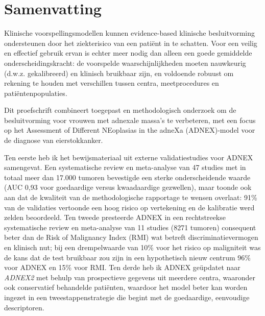 \chapter*{Samenvatting}
Klinische voorspellingsmodellen kunnen evidence-based klinische besluitvorming ondersteunen door het ziekterisico van een patiënt in te schatten. Voor een veilig en effectief gebruik ervan is echter meer nodig dan alleen een goede gemiddelde onderscheidingskracht: de voorspelde waarschijnlijkheden moeten nauwkeurig (d.w.z. gekalibreerd) en klinisch bruikbaar zijn, en voldoende robuust om rekening te houden met verschillen tussen centra, meetprocedures en patiëntenpopulaties.

Dit proefschrift combineert toegepast en methodologisch onderzoek om de besluitvorming voor vrouwen met adnexale massa's te verbeteren, met een focus op het Assessment of Different NEoplasias in the adneXa (\gls{ADNEX})-model voor de diagnose van eierstokkanker.

Ten eerste heb ik het bewijsmateriaal uit externe validatiestudies voor \gls{ADNEX} samengevat. Een systematische review en meta-analyse van 47 studies met in totaal meer dan 17.000 tumoren bevestigde een sterke onderscheidende waarde (AUC 0,93 voor goedaardige versus kwaadaardige gezwellen), maar toonde ook aan dat de kwaliteit van de methodologische rapportage te wensen overlaat: 91\% van de validaties vertoonde een hoog risico op vertekening en de kalibratie werd zelden beoordeeld. Ten tweede presteerde \gls{ADNEX} in een rechtstreekse systematische review en meta-analyse van 11 studies (8271 tumoren) consequent beter dan de Risk of Malignancy Index (\gls{RMI}) wat betreft discriminatievermogen en klinisch nut; bij een drempelwaarde van 10\% voor het risico op maligniteit was de kans dat de test bruikbaar zou zijn in een hypothetisch nieuw centrum 96\% voor \gls{ADNEX} en 15\% voor \gls{RMI}. Ten derde heb ik \gls{ADNEX} geüpdatet naar \emph{ADNEX2} met behulp van prospectieve gegevens uit meerdere centra, waaronder ook conservatief behandelde patiënten, waardoor het model beter kan worden ingezet in een tweestappenstrategie die begint met de goedaardige, eenvoudige descriptoren. 


